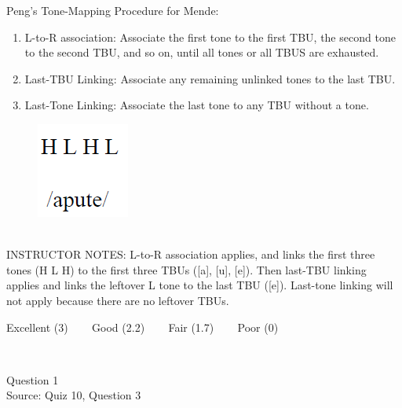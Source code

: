 \documentclass[12pt]{article}
\begin{document}
Peng’s Tone-Mapping Procedure for Mende: \begin{enumerate} \item L-to-R association: Associate the first tone to the first TBU, the second tone to the second TBU, and so on, until all tones or all TBUS are exhausted. \item Last-TBU Linking: Associate any remaining unlinked tones to the last TBU. \item Last-Tone Linking: Associate the last tone to any TBU without a tone. \end{enumerate}

\begin{figure}[H]
\includegraphics{../images/mendetone_d.png}
\end{figure}

~\\
INSTRUCTOR NOTES: L-to-R association applies, and links the first three tones (H L H) to the first three TBUs ([a], [u], [e]). Then last-TBU linking applies and links the leftover L tone to the last TBU ([e]). Last-tone linking will not apply because there are no leftover TBUs.


\vfill
Excellent (3) ~~~ Good (2.2) ~~~ Fair (1.7) ~~~ Poor (0)
\newpage

\begin{center}
\textbf{{\color{red}{\HUGE END OF EXAM}}}\\

\end{center}
\newpage

\begin{center}
\textbf{{\color{blue}{\HUGE START OF EXAM\\}}}

\textbf{{\color{blue}{\HUGE Student ID: 2357\\}}}

\textbf{{\color{blue}{\HUGE 11:30 - 11:50 AM\\}}}

\end{center}
\newpage

{\large Question 1}\\

Source: Quiz 10, Question 3\\
\end{document}

